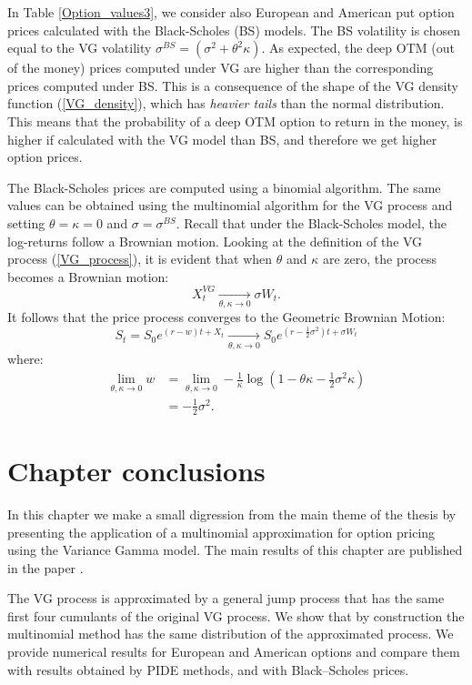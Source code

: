 In Table \ref{Option_values3}, we consider also European and American put option prices 
calculated with the Black-Scholes (BS) models.
The BS volatility is chosen equal to the VG volatility $ \sigma^{BS} = (\sigma^2 + \theta^2 \kappa)$.
As expected, the deep OTM (out of the money) prices computed under VG are higher than the corresponding prices computed under BS. This is a consequence of the
shape of the VG density function (\ref{VG_density}), which has \emph{heavier tails} than the normal distribution. 
This means that the probability of a deep OTM option to return in the money, 
is higher if calculated with the VG model than BS, and therefore we get higher option prices.

The Black-Scholes prices are computed using a binomial algorithm.  
The same values can be obtained using the multinomial algorithm for the VG process and setting $\theta = \kappa = 0$ and $\sigma = \sigma^{BS}$.
Recall that under the Black-Scholes model, the log-returns follow a Brownian motion. 
Looking at the definition of the VG process (\ref{VG_process}), it is evident that when $\theta$ and $\kappa$ are zero, the process becomes a Brownian motion:
$$ X^{VG}_t \underset{\theta,\kappa \to 0}{\to} \sigma W_t. $$
It follows that the price process converges to the Geometric Brownian Motion:
$$ S_t = S_0 e^{(r-w)t + X_t} \underset{\theta,\kappa \to 0}{\to} S_0 e^{(r-\frac{1}{2}\sigma^2)t + \sigma W_t} $$
where:
\begin{align*}
 \lim_{\theta,\kappa \to 0} w &= \lim_{\theta,\kappa \to 0} -\frac{1}{\kappa} \log(1-\theta \kappa -\frac{1}{2}\sigma^2 \kappa) \\
 &= -\frac{1}{2}\sigma^2.
\end{align*}




\section{Chapter conclusions}


In this chapter we make a small digression from the main theme of the thesis by presenting the application of a multinomial approximation for option pricing 
using the Variance Gamma model.
The main results of this chapter are published in the paper \cite{Canta2}. 

The VG process is approximated by a general jump process that has the same first four cumulants of the original VG process. 
We show that by construction the multinomial method has the same distribution of the approximated process. 
We provide numerical results for European and American options and compare them with
results obtained by PIDE methods, and with Black–Scholes prices.

